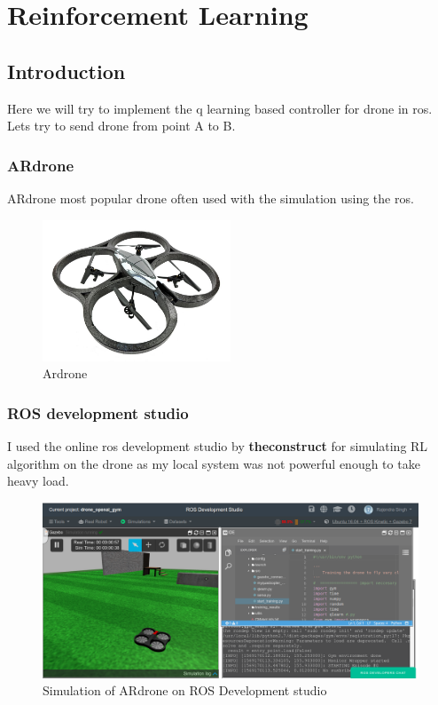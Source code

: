 \section{Reinforcement Learning}
\subsection{Introduction}
Here we will try to implement the q learning based controller for drone in ros. Lets try to send drone from point A to B.
\subsubsection{ARdrone}
ARdrone most popular drone often used with the simulation using the ros.\cite{ardrone}
\begin{figure}[H]
    \centering
    \includegraphics[width=0.5\textwidth]{images/ardrone.jpg}
    \caption{Ardrone}
\end{figure}
\subsubsection{ROS development studio}
I used the online ros development studio by \textbf{theconstruct} for simulating RL algorithm on the drone as my local system was not powerful enough to take heavy load.\cite{rds}

\begin{figure}[H]
    \centering
    \includegraphics[width=\textwidth]{images/rds.png}
    \caption{Simulation of ARdrone on ROS Development studio}
\end{figure}





